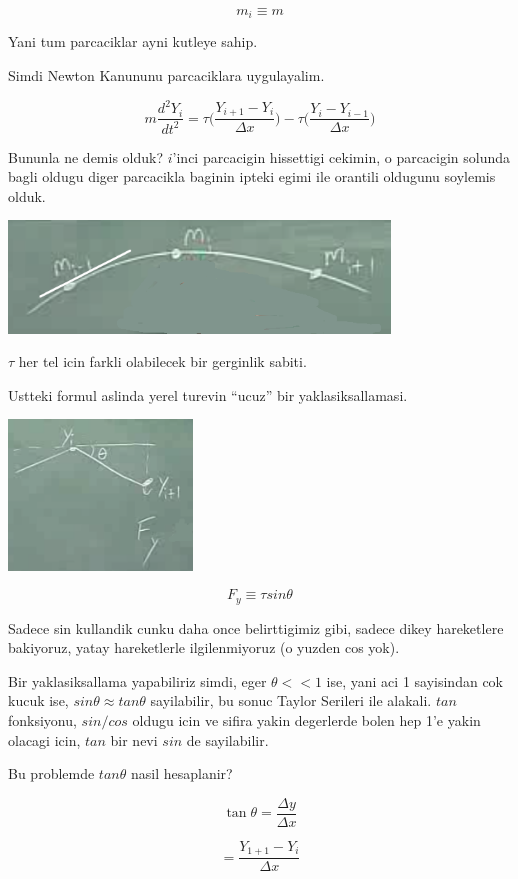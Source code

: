 \documentclass[12pt,fleqn]{article}
\begin{document}
\[ m_i \equiv m \]

Yani tum parcaciklar ayni kutleye sahip. 

Simdi Newton Kanununu parcaciklara uygulayalim. 

\[ m \frac{d^2Y_i}{dt^2} = 
\tau \bigg( \frac{Y_{i+1}- Y_i}{\Delta x} \bigg) -
\tau \bigg( \frac{Y_{i}- Y_{i-1}}{\Delta x} \bigg) 
\]

Bununla ne demis olduk? $i$'inci parcacigin hissettigi cekimin, o
parcacigin solunda bagli oldugu diger parcacikla baginin ipteki egimi ile
orantili oldugunu soylemis olduk.

\includegraphics[height=3cm]{1_08.png}

$\tau$ her tel icin farkli olabilecek bir gerginlik sabiti. 

Ustteki formul aslinda yerel turevin ``ucuz'' bir yaklasiksallamasi. 

\includegraphics[height=4cm]{1_09.png}

\[ F_y \equiv \tau sin\theta \]

Sadece sin kullandik cunku daha once belirttigimiz gibi, sadece dikey
hareketlere bakiyoruz, yatay hareketlerle ilgilenmiyoruz (o yuzden cos
yok). 

Bir yaklasiksallama yapabiliriz simdi, eger $\theta << 1$ ise, yani aci 1
sayisindan cok kucuk ise, $sin\theta \approx tan\theta$ sayilabilir, bu
sonuc Taylor Serileri ile alakali. $tan$ fonksiyonu, $sin / cos$ oldugu
icin ve sifira yakin degerlerde bolen hep 1'e yakin olacagi icin, $tan$ bir
nevi $sin$ de sayilabilir. 

Bu problemde $tan\theta$ nasil hesaplanir?

\[  \tan\theta = \frac{\Delta y}{\Delta x} \]

\[ = \frac{Y_{1+1}-Y_i}{\Delta x} \]
\end{document}
